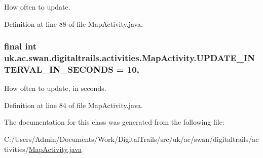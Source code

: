 How often to update. 



Definition at line 88 of file Map\+Activity.\+java.

\hypertarget{classuk_1_1ac_1_1swan_1_1digitaltrails_1_1activities_1_1_map_activity_a54804664f1186e4588950140c98a7830}{
\subsubsection[{U\+P\+D\+A\+T\+E\+\_\+\+I\+N\+T\+E\+R\+V\+A\+L\+\_\+\+I\+N\+\_\+\+S\+E\+C\+O\+N\+D\+S}]{\setlength{\rightskip}{0pt plus 5cm}final int uk.\+ac.\+swan.\+digitaltrails.\+activities.\+Map\+Activity.\+U\+P\+D\+A\+T\+E\+\_\+\+I\+N\+T\+E\+R\+V\+A\+L\+\_\+\+I\+N\+\_\+\+S\+E\+C\+O\+N\+D\+S = 10\hspace{0.3cm}{\ttfamily [static]}, {\ttfamily [private]}}}\label{classuk_1_1ac_1_1swan_1_1digitaltrails_1_1activities_1_1_map_activity_a54804664f1186e4588950140c98a7830}


How often to update, in seconds. 



Definition at line 84 of file Map\+Activity.\+java.



The documentation for this class was generated from the following file\+:\begin{DoxyCompactItemize}
\item 
C\+:/\+Users/\+Admin/\+Documents/\+Work/\+Digital\+Trails/src/uk/ac/swan/digitaltrails/activities/\hyperlink{_map_activity_8java}{Map\+Activity.\+java}\end{DoxyCompactItemize}
